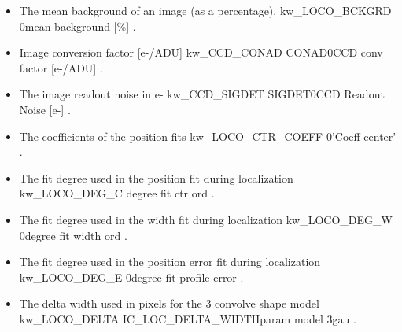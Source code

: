 \begin{itemize}

\item {}
{The mean background of an image (as a percentage).}
{kw\_LOCO\_BCKGRD}
{}{0}{mean background [\%]}
{\callocRAW}{\spirouKeywords}{\callocRAW.\progMAIN}


\item {}
{Image conversion factor [e-/ADU]}
{kw\_CCD\_CONAD}
{CONAD}{0}{CCD conv factor [e-/ADU]}
{\callocRAW}{\spirouKeywords}{\callocRAW.\progMAIN}


\item {} 
{The image readout noise in e-}
{kw\_CCD\_SIGDET}
{SIGDET}{0}{CCD Readout Noise [e-]}
{\callocRAW}{\spirouKeywords}{\callocRAW.\progMAIN}


\item {}
{The coefficients of the position fits}
{kw\_LOCO\_CTR\_COEFF}
{}{0}{'Coeff center'}
{\callocRAW}{\spirouKeywords}{\callocRAW.\progMAIN}


\item {}
{The fit degree used in the position fit during localization}
{kw\_LOCO\_DEG\_C}
{}{}{degree fit ctr ord}
{\callocRAW}{\spirouKeywords}{\callocRAW.\progMAIN}


\item {}
{The fit degree used in the width fit during localization}
{kw\_LOCO\_DEG\_W}
{}{0}{degree fit width ord}
{\callocRAW}{\spirouKeywords}{\callocRAW.\progMAIN}


\item {}
{The fit degree used in the position error fit during localization}
{kw\_LOCO\_DEG\_E}
{}{0}{degree fit profile error}
{\callocRAW}{\spirouKeywords}{\callocRAW.\progMAIN}


\item {}
{The delta width used in pixels for the 3 convolve shape model}
{kw\_LOCO\_DELTA}
{}{IC\_LOC\_DELTA\_WIDTH}{param model 3gau}
{\callocRAW}{\spirouKeywords}{\callocRAW.\progMAIN}



\end{itemize}
